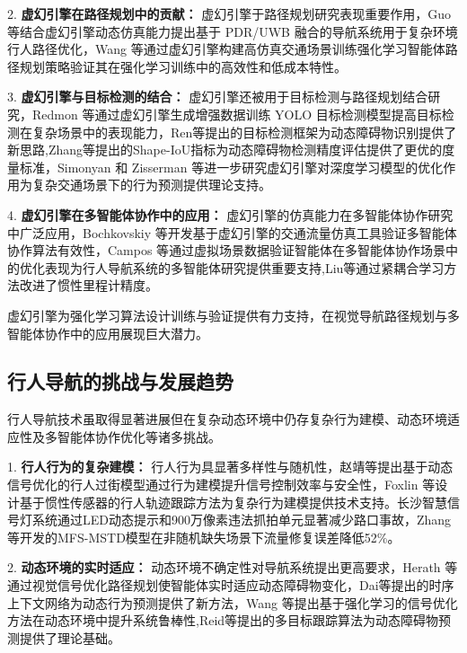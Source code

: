 2. \textbf{虚幻引擎在路径规划中的贡献：} 虚幻引擎于路径规划研究表现重要作用，Guo 等\cite{guo2020pdr}结合虚幻引擎动态仿真能力提出基于 PDR/UWB 融合的导航系统用于复杂环境行人路径优化，Wang 等\cite{wang2023llio}通过虚幻引擎构建高仿真交通场景训练强化学习智能体路径规划策略验证其在强化学习训练中的高效性和低成本特性。

3. \textbf{虚幻引擎与目标检测的结合：} 虚幻引擎还被用于目标检测与路径规划结合研究，Redmon 等\cite{redmon2017yolo9000}通过虚幻引擎生成增强数据训练 YOLO 目标检测模型提高目标检测在复杂场景中的表现能力，Ren等\cite{ren2017fasterrcnn}提出的目标检测框架为动态障碍物识别提供了新思路,Zhang等\cite{zhang2023shapeiou}提出的Shape-IoU指标为动态障碍物检测精度评估提供了更优的度量标准，Simonyan 和 Zisserman 等\cite{simonyan2014action}进一步研究虚幻引擎对深度学习模型的优化作用为复杂交通场景下的行为预测提供理论支持。 

4. \textbf{虚幻引擎在多智能体协作中的应用：} 虚幻引擎的仿真能力在多智能体协作研究中广泛应用，Bochkovskiy 等\cite{bochkovskiy2020yolov4}开发基于虚幻引擎的交通流量仿真工具验证多智能体协作算法有效性，Campos 等\cite{campos2021orbslam3}通过虚拟场景数据验证智能体在多智能体协作场景中的优化表现为行人导航系统的多智能体研究提供重要支持,Liu等\cite{liu2020tlio}通过紧耦合学习方法改进了惯性里程计精度。

虚幻引擎为强化学习算法设计训练与验证提供有力支持，在视觉导航路径规划与多智能体协作中的应用展现巨大潜力。

\subsection{行人导航的挑战与发展趋势}

行人导航技术虽取得显著进展但在复杂动态环境中仍存复杂行为建模、动态环境适应性及多智能体协作优化等诸多挑战。

1. \textbf{行人行为的复杂建模：} 行人行为具显著多样性与随机性，赵靖等\cite{zhao2014crossing}提出基于动态信号优化的行人过街模型通过行为建模提升信号控制效率与安全性，Foxlin 等\cite{foxlin2005tracking}设计基于惯性传感器的行人轨迹跟踪方法为复杂行为建模提供技术支持。长沙智慧信号灯系统\cite{changsha2021}通过LED动态提示和900万像素违法抓拍单元显著减少路口事故，Zhang等\cite{zhang2025traffic}开发的MFS-MSTD模型在非随机缺失场景下流量修复误差降低52\%。

2. \textbf{动态环境的实时适应：} 动态环境不确定性对导航系统提出更高要求，Herath 等\cite{herath2020ronin}通过视觉信号优化路径规划使智能体实时适应动态障碍物变化，Dai等\cite{dai2017temporalcontext}提出的时序上下文网络为动态行为预测提供了新方法，Wang 等\cite{wang2013densetrajectory}提出基于强化学习的信号优化方法在动态环境中提升系统鲁棒性,Reid等\cite{reid1980tracking}提出的多目标跟踪算法为动态障碍物预测提供了理论基础。

